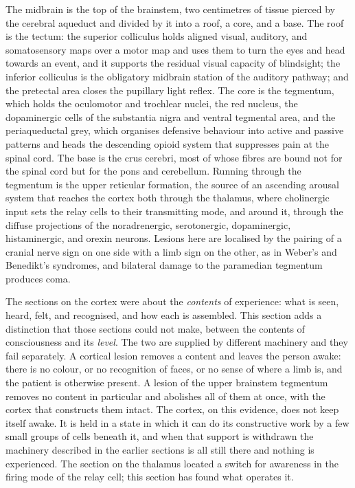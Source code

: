 \documentclass[11pt]{article}
\begin{document}
The midbrain is the top of the brainstem, two centimetres of tissue pierced by the cerebral aqueduct and divided by it into a roof, a core, and a base. The roof is the tectum: the superior colliculus holds aligned visual, auditory, and somatosensory maps over a motor map and uses them to turn the eyes and head towards an event, and it supports the residual visual capacity of blindsight; the inferior colliculus is the obligatory midbrain station of the auditory pathway; and the pretectal area closes the pupillary light reflex. The core is the tegmentum, which holds the oculomotor and trochlear nuclei, the red nucleus, the dopaminergic cells of the substantia nigra and ventral tegmental area, and the periaqueductal grey, which organises defensive behaviour into active and passive patterns and heads the descending opioid system that suppresses pain at the spinal cord. The base is the crus cerebri, most of whose fibres are bound not for the spinal cord but for the pons and cerebellum. Running through the tegmentum is the upper reticular formation, the source of an ascending arousal system that reaches the cortex both through the thalamus, where cholinergic input sets the relay cells to their transmitting mode, and around it, through the diffuse projections of the noradrenergic, serotonergic, dopaminergic, histaminergic, and orexin neurons. Lesions here are localised by the pairing of a cranial nerve sign on one side with a limb sign on the other, as in Weber's and Benedikt's syndromes, and bilateral damage to the paramedian tegmentum produces coma.

The sections on the cortex were about the \textit{contents} of experience: what is seen, heard, felt, and recognised, and how each is assembled. This section adds a distinction that those sections could not make, between the contents of consciousness and its \textit{level}. The two are supplied by different machinery and they fail separately. A cortical lesion removes a content and leaves the person awake: there is no colour, or no recognition of faces, or no sense of where a limb is, and the patient is otherwise present. A lesion of the upper brainstem tegmentum removes no content in particular and abolishes all of them at once, with the cortex that constructs them intact. The cortex, on this evidence, does not keep itself awake. It is held in a state in which it can do its constructive work by a few small groups of cells beneath it, and when that support is withdrawn the machinery described in the earlier sections is all still there and nothing is experienced. The section on the thalamus located a switch for awareness in the firing mode of the relay cell; this section has found what operates it.
\end{document}

